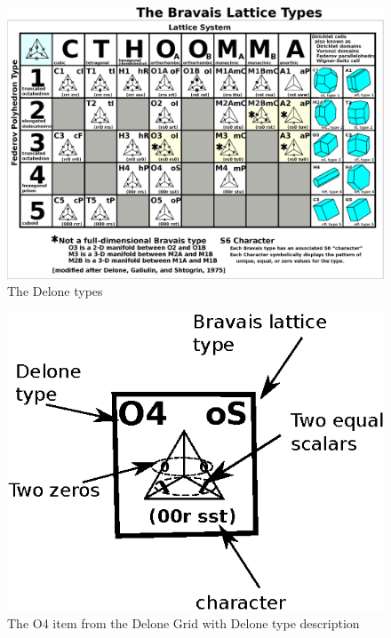 \documentclass[preprint]{iucr}              %
\begin{document}
		
	\begin{figure}
		\centering
		\includegraphics[angle=90, width=0.7\textheight]{DeloneGridClaude_2-3}
		\caption{The Delone types}
		\label{fig:rotatedDeloneTypes}
	\end{figure}
	
	\begin{figure}
		\caption{The O4 item from the Delone Grid with Delone type description}
		\label{fig:O4_terminology}
		\includegraphics[width=12cm]{O4_terminology}
	\end{figure}
	
\end{document}
